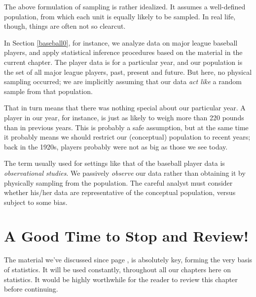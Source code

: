 The above formulation of sampling is rather idealized.  It assumes a
well-defined population, from which each unit is equally likely to be
sampled.  In real life, though, things are often not so clearcut.

In Section \ref{baseball0}, for instance, we analyze data on major
league baseball players, and apply statistical inference procedures
based on the material in the current chapter.  The player data is for a
particular year, and our population is the set of all major league
players, past, present and future.  But here, no physical sampling
occurred; we are implicitly assuming that our data {\it act like} a
random sample from that population.  

That in turn means that there was nothing special about our particular
year.  A player in our year, for instance, is just as likely to weigh
more than 220 pounds than in previous years.  This is probably a safe
assumption, but at the same time it probably means we should restrict
our (conceptual) population to recent years; back in the 1920s, players
probably were not as big as those we see today.

The term usually used for settings like that of the baseball player data
is {\it observational studies}.  We passively {\it observe} our data
rather than obtaining it by physically sampling from the population.
The careful analyst must consider whether his/her data are
representative of the conceptual population, versus subject to some
bias.

\section{A Good Time to Stop and Review!} 
 
The material we've discussed since page \pageref{startcrucial}, is
absolutely key, forming the very basis of statistics.  It will be used
constantly, throughout all our chapters here on statistics.  It would be
highly worthwhile for the reader to review this chapter before
continuing.
 
